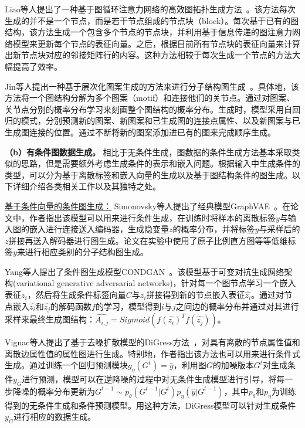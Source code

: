 \documentclass[12pt,UTF8,AutoFakeBold=2,a4paper]{ctexart} %
\begin{document}
Liao等人提出了一种基于图循环注意力网络的高效图拓扑生成方法~\cite{liao2019efficient}。该方法每次生成的并不是一个节点，而是若干节点组成的节点块（block）。每次基于已有的图结构，该方法生成一个包含多个节点的节点块，并利用基于信息传递的图注意力网络模型来更新每个节点的表征向量。之后，根据目前所有节点块的表征向量来计算出新节点块对应的邻接矩阵行的内容。这种方法相较于每次生成一个节点的方法大幅提高了效率。

Jin等人提出一种基于层次化图案生成的方法来进行分子结构图生成~\cite{jin2020hierarchical}。具体地，该方法将一个图结构分解为多个图案（motif）和连接他们的关节点。通过对图案、关节点分别的概率分布学习来刻画整个图结构的概率分布。生成时，模型采用自回归的模式，分别预测新的图案、新图案和已生成图的连接点属性、以及新图案与已生成图连接的位置。通过不断将新的图案添加进已有的图来完成顺序生成。


\textbf{（b）有条件图数据生成。} 
相比于无条件生成，图数据的条件生成方法基本采取类似的思路，但是需要额外考虑生成条件的表示和嵌入问题。根据输入中生成条件的类型，可以分为基于离散标签和嵌入向量的生成以及基于图结构条件的图生成。以下详细介绍各类相关工作以及其独特之处。 

\underline{基于条件向量的条件图生成：} Simonovsky等人提出了经典模型GraphVAE~\cite{simonovsky2018graphvae}。在论文中，作者指出该模型可以用来进行条件生成，在训练时将样本的离散标签$y$与输入图的嵌入进行连接送入编码器，生成隐变量$z$的概率分布，并将标签$y$与采样后的$z$拼接再送入解码器进行图生成。论文在实验中使用了原子比例直方图等等低维标签$y$来进行相应类别的分子结构图生成。

Yang等人提出了条件图生成模型CONDGAN~\cite{yang2019conditional}。该模型基于可变对抗生成网络架构(variational generative adversarial networks)，针对每一个图节点学习一个嵌入表征$z_i$，然后将生成条件标签向量$C$与$z_i$拼接得到新的节点嵌入表征$\hat{z_i}$。通过对节点嵌入$\hat{z_i}$和$\hat{z_j}$的解码函数$f$的学习，模型得到$i$与$j$之间边的概率分布并通过对其进行采样来最终生成图结构：$\hat{A_{i,j}} = Sigmoid(f(\hat{z_i})^Tf(\hat{z_j}))$。

Vignac等人提出了基于去噪扩散模型的DiGress方法~\cite{vignac2022digress}，对具有离散的节点属性值和离散边属性值的属性图进行生成。特别地，作者指出该方法也可以用来进行条件式生成。通过训练一个回归预测模块$g_\eta(G^t) = \hat{y}$，利用图$G$的加噪版本$G^t$对生成条件$y_G$进行预测，模型可以在逆降噪的过程中对无条件生成模型进行引导，将每一步降噪的概率分布更新为$G^{t-1}\sim p_\theta(G^{t-1}|G^t)p_\eta(\hat{y}|G^{t-1})$，其中$p_\theta$和$p_\eta$为训练得到的无条件生成和条件预测模型。用这种方法，DiGress模型可以针对生成条件$y_G$进行相应的数据生成。
%
\end{document}
